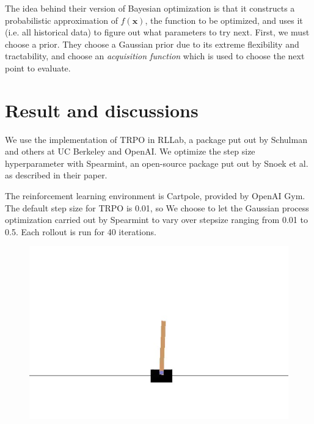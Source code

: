 \documentclass[final]{beamer}
\begin{document}
\begin{frame}[t]
\begin{multicols}{3}
The idea behind their version of Bayesian optimization is that it constructs a probabilistic approximation of $f(\mathbf{x})$, the function to be optimized, and uses it (i.e. all historical data) to figure out what parameters to try next. First, we must choose a prior. They choose a Gaussian prior due to its extreme flexibility and tractability, and choose an \textit{acquisition function} which is used to choose the next point to evaluate.





\section{Result and discussions}

We use the implementation of TRPO in RLLab, a package put out by Schulman and others at UC Berkeley and OpenAI. We optimize the step size hyperparameter with Spearmint, an open-source package put out by Snoek et al. as described in their paper.

The reinforcement learning environment is Cartpole, provided by OpenAI Gym. The default step size for TRPO is 0.01, so We choose to let the Gaussian process optimization carried out by Spearmint to vary over stepsize ranging from 0.01 to 0.5. Each rollout is run for 40 iterations.

\begin{figure}[h]
  \includegraphics{cartpole.jpg}


\end{figure}
\end{multicols}
\end{frame}
\end{document}
